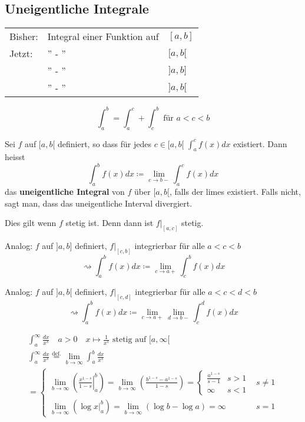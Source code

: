 \subsection{Uneigentliche Integrale}
\begin{tabular}{ l l l }
	Bisher:	&Integral einer Funktion auf	&$[a,b]$	\\
	Jetzt:		&'' - ''				&$[a,b[$	\\
			&'' - ''				&$]a,b]$	\\
			&'' - ''				&$]a,b[$	
\end{tabular}
\[ \int_a^b = \int_a^c + \int_c^b \text{ für } a < c < b \]
\begin{def*}[note = uneigentlischer Grenzwert , index = uneigentlischer Grenzwert]
	Sei $f$ auf $[a,b[$ definiert, so dass für jedes $c \in [a,b[$ $\int_a^c f(x) dx$ existiert. Dann heisst
	\[ \int_a^b f(x) dx \coloneqq \lim_{c \rightarrow b-} \int_a^c f(x) dx \]
	das \textbf{uneigentliche Integral} von $f$ über $[a,b[$, falls der limes existiert. Falls nicht, sagt man, dass das uneigentliche Interval divergiert. \\
	\begin{bem}
		Dies gilt wenn $f$ stetig ist. Denn dann ist $f|_{[a,c]}$ stetig.
	\end{bem}
	
	Analog: $f$ auf $]a,b]$ definiert, $f|_{[c,b]}$ integrierbar für alle $a < c < b $
	\[ \rightsquigarrow \int_a^b f(x) dx \coloneqq \lim_{c \rightarrow a+} \int_c^b f(x) dx \]
	
	Analog: $f$ auf $]a,b[$ definiert, $f|_{[c,d]}$ integrierbar für alle $a < c < d < b$
	\[ \rightsquigarrow \int_a^b f(x) dx \coloneqq \lim_{c \rightarrow a+} \lim_{d \rightarrow b-} \int_c^d f(x) dx \]
\end{def*}
\begin{bsp}
	\begin{gather*}
		\int_a^\infty \frac{dx}{x^s} \quad a > 0 \quad x \mapsto \frac{1}{x^s} \text{ stetig auf } [a,\infty[ \\
		\int_a^\infty \frac{dx}{x^s} \overset{\text{def.}}{=} \lim_{b \rightarrow \infty} \int_a^b \frac{dx}{x^s} \\
		= \begin{cases}
			\lim_{b \rightarrow \infty} \left( \left. \frac{x^{1-s}}{1-s} \right|_a^b \right) = \lim_{b \rightarrow \infty} \left( \frac{b^{1-s} - a^{1-s}}{1-s} \right) = \begin{cases}
				\frac{a^{1-s}}{s-1}	&s > 1	\\
				\infty			&s < 1 	
			\end{cases}	&s \neq 1	\\
			\lim_{b \rightarrow \infty} ( \log x |_a^b ) = \lim_{b \rightarrow \infty} (\log b - \log a) = \infty	&s = 1
		\end{cases}
	\end{gather*}
\end{bsp}

